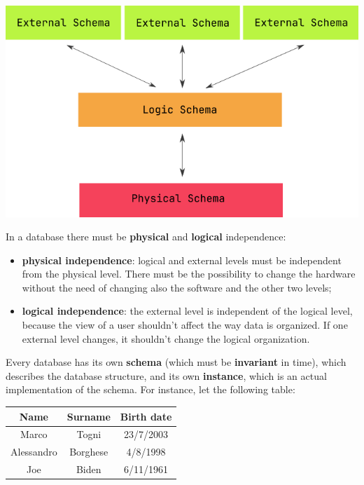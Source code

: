 \begin{center}
    \includegraphics[scale = 0.45]{assets/images/DBLevels.png}
\end{center}

In a database there must be \textbf{physical} and \textbf{logical} independence:
\begin{itemize}
    \item \textbf{physical independence}: logical and external levels must be independent from the physical level. There must be the possibility to change the hardware without the need of changing also the software and the other two levels;
    \item \textbf{logical independence}: the external level is independent of the logical level, because the view of a user shouldn't affect the way data is organized. If one external level changes, it shouldn't change the logical organization.
\end{itemize}

Every database has its own \textbf{schema} (which must be \textbf{invariant} in time), which describes the database structure, and its own \textbf{instance}, which is an actual implementation of the schema. For instance, let the following table:

\begin{center}
    \begin{tabular}{|c|c|c|}
        \hline \rowcolor{maindoccol!60}
        \textbf{Name} & \textbf{Surname} & \textbf{Birth date} \\
        \hline
        Marco & Togni & 23/7/2003 \\
        \hline
        Alessandro & Borghese & 4/8/1998 \\
        \hline
        Joe & Biden & 6/11/1961 \\
        \hline
    \end{tabular}
\end{center}

